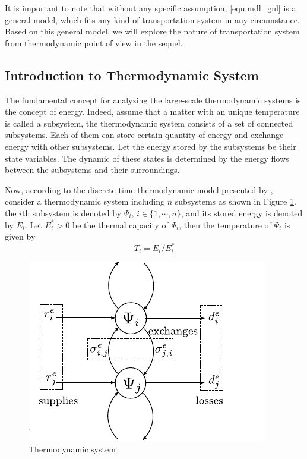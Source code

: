 \documentclass[preprint,authoryear,12pt]{elsarticle}
\begin{document}
It is important to note that without any specific assumption, \eqref{equ:mdl_gnl} is a general model, which fits any kind of transportation system in any circumstance. Based on this general model, we will explore the nature of transportation system from thermodynamic point of view in the sequel.

\subsection{Introduction to Thermodynamic System}

The fundamental concept for analyzing the large-scale thermodynamic systems is the concept of energy. Indeed, assume that a matter with an unique temperature is called a subsystem, the thermodynamic system consists of a set of connected subsystems. Each of them can store certain quantity of energy and exchange energy with other subsystems.
Let the energy stored by the subsystems be their state variables. The dynamic of these states is determined by the energy flows between the subsystems and their surroundings.

Now, according to the discrete-time thermodynamic model presented by \citet{haddad_thermodynamic_2005}, consider a thermodynamic system including $n$ subsystems as shown in Figure \ref{fig:Ther_Sys}. the $i$th subsystem is denoted by $\Psi_i$, $i\in \{1,\cdots,n\}$, and its stored energy is denoted by $E_i$. Let $E_i^*>0$ be the thermal capacity of $\Psi_i$, then the temperature of $\Psi_i$ is given by
\begin{equation}\label{equ:temperature}
    T_i= {E_i}/{E^*_i}
\end{equation}

\begin{figure}[ht]
  \centering
  \includegraphics{pics/HModel}
  \caption{Thermodynamic system}
  \label{fig:Ther_Sys}
\end{figure}
\end{document}
